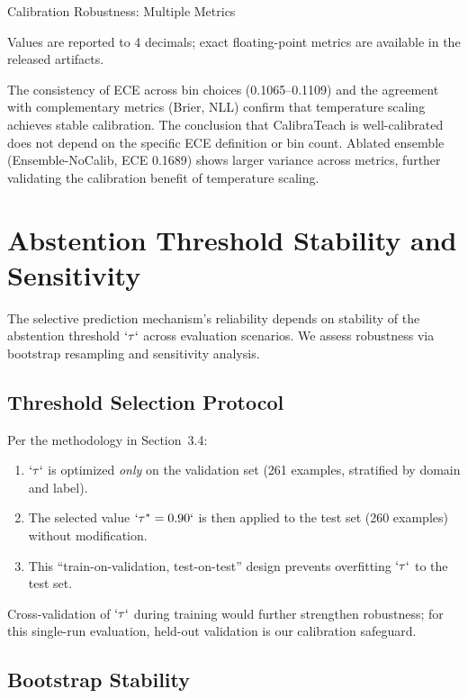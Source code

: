 Calibration Robustness: Multiple Metrics

Values are reported to 4 decimals; exact floating-point metrics are available in the released artifacts.

The consistency of ECE across bin choices (0.1065--0.1109) and the agreement with complementary metrics (Brier, NLL) confirm that temperature scaling achieves stable calibration. The conclusion that CalibraTeach is well-calibrated does not depend on the specific ECE definition or bin count. Ablated ensemble (Ensemble-NoCalib, ECE 0.1689) shows larger variance across metrics, further validating the calibration benefit of temperature scaling.

\section{Abstention Threshold Stability and Sensitivity}\label{abstention-threshold-stability-and-sensitivity}

The selective prediction mechanism's reliability depends on stability of the abstention threshold \(`\tau`\) across evaluation scenarios. We assess robustness via bootstrap resampling and sensitivity analysis.

\subsection{Threshold Selection Protocol}\label{threshold-selection-protocol}

Per the methodology in Section~3.4:

\begin{enumerate}
\def\labelenumi{\arabic{enumi}.}
\item
  \(`\tau`\) is optimized \emph{only} on the validation set (261 examples, stratified by domain and label).
\item
  The selected value \(`\tau^* = 0.90`\) is then applied to the test set (260 examples) without modification.
\item
  This ``train-on-validation, test-on-test'' design prevents overfitting \(`\tau`\) to the test set.
\end{enumerate}

Cross-validation of \(`\tau`\) during training would further strengthen robustness; for this single-run evaluation, held-out validation is our calibration safeguard.

\subsection{Bootstrap Stability}\label{bootstrap-stability}

